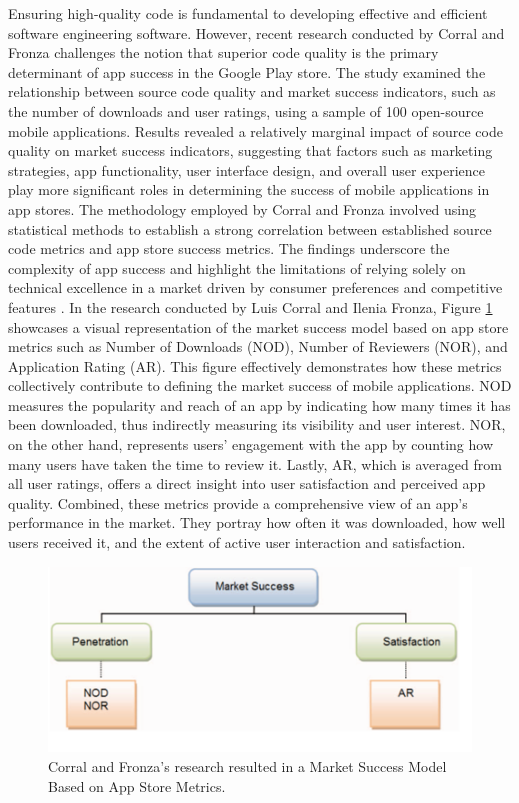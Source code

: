 Ensuring high-quality code is fundamental to developing effective and efficient software engineering software. However, recent research \cite{corral2015better} conducted by Corral and Fronza challenges the notion that superior code quality is the primary determinant of app success in the Google Play store. The study examined the relationship between source code quality and market success indicators, such as the number of downloads and user ratings, using a sample of 100 open-source mobile applications. Results revealed a relatively marginal impact of source code quality on market success indicators, suggesting that factors such as marketing strategies, app functionality, user interface design, and overall user experience play more significant roles in determining the success of mobile applications in app stores. The methodology employed by Corral and Fronza involved using statistical methods to establish a strong correlation between established source code metrics and app store success metrics. The findings underscore the complexity of app success and highlight the limitations of relying solely on technical excellence in a market driven by consumer preferences and competitive features \cite{corral2015better}. In the research conducted by Luis Corral and Ilenia Fronza, Figure \ref*{fig:graph_lr} showcases a visual representation of the market success model based on app store metrics such as Number of Downloads (NOD), Number of Reviewers (NOR), and Application Rating (AR). This figure effectively demonstrates how these metrics collectively contribute to defining the market success of mobile applications. NOD measures the popularity and reach of an app by indicating how many times it has been downloaded, thus indirectly measuring its visibility and user interest. NOR, on the other hand, represents users' engagement with the app by counting how many users have taken the time to review it. Lastly, AR, which is averaged from all user ratings, offers a direct insight into user satisfaction and perceived app quality. Combined, these metrics provide a comprehensive view of an app's performance in the market. They portray how often it was downloaded, how well users received it, and the extent of active user interaction and satisfaction.
\begin{figure}[htbp]
    \centering
    \includegraphics[scale = 0.8]{img/graph_lr.png}
    \caption{Corral and Fronza's research resulted in a Market Success Model Based on App Store Metrics.}
    \label{fig:graph_lr}
\end{figure}

